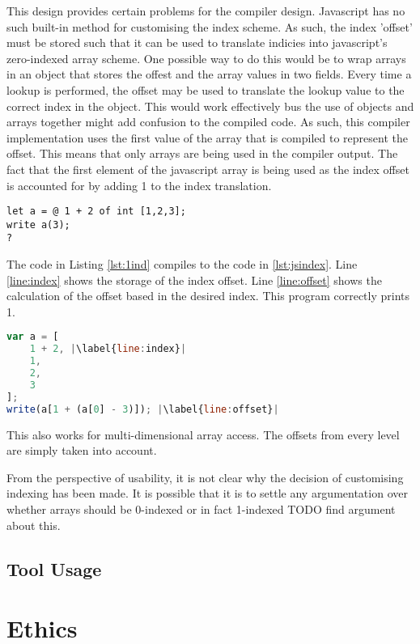 \documentclass{article}
\begin{document}
This design provides certain problems for the compiler design. Javascript has no such built-in method for customising the index scheme. As such, the index 'offset' must be stored such that it can be used to translate indicies into javascript's zero-indexed array scheme. One possible way to do this would be to wrap arrays in an object that stores the offest and the array values in two fields. Every time a lookup is performed, the offset may be used to translate the lookup value to the correct index in the object. This would work effectively bus the use of objects and arrays together might add confusion to the compiled code. As such, this compiler implementation uses the first value of the array that is compiled to represent the offset. This means that only arrays are being used in the compiler output. The fact that the first element of the javascript array is being used as the index offset is accounted for by adding 1 to the index translation.

\begin{lstlisting}[caption={1-Indexed Array},label={lst:1ind}, escapechar="|"]
let a = @ 1 + 2 of int [1,2,3];
write a(3);
?
\end{lstlisting}

The code in Listing \ref{lst:1ind} compiles to the code in \ref{lst:jsindex}. Line \ref{line:index} shows the storage of the index offset. Line \ref{line:offset} shows the calculation of the offset based in the desired index. This program correctly prints 1.

\begin{lstlisting}[caption={TODO},label={lst:jsindex},language=javascript, escapechar="|"]
var a = [
    1 + 2, |\label{line:index}|
    1,
    2,
    3
];
write(a[1 + (a[0] - 3)]); |\label{line:offset}|
\end{lstlisting}

This also works for multi-dimensional array access. The offsets from every level are simply taken into account.

From the perspective of usability, it is not clear why the decision of customising indexing has been made. It is possible that it is to settle any argumentation over whether arrays should be 0-indexed or in fact 1-indexed TODO find argument about this.

\subsection{Tool Usage}

\section{Ethics}
 
\end{document}
